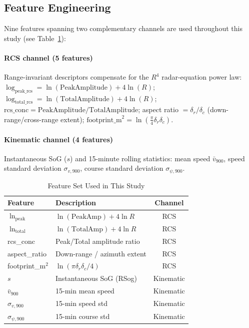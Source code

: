 \documentclass[10pt,journal,compsoc]{IEEEtran}
\begin{document}
\subsection{Feature Engineering}

Nine features spanning two complementary channels are used throughout this
study (see Table~\ref{tab:features}):

\paragraph{RCS channel (5 features)} Range-invariant descriptors compensate for
the $R^4$ radar-equation power law: $\log_{\text{peak\_rcs}} =
\ln(\text{PeakAmplitude}) + 4\ln(R)$; $\log_{\text{total\_rcs}} =
\ln(\text{TotalAmplitude}) + 4\ln(R)$; $\text{rcs\_conc} =
\text{PeakAmplitude}/\text{TotalAmplitude}$; aspect ratio
$= \delta_r / \delta_c$ (down-range/cross-range extent);
$\text{footprint\_m}^2 = \ln\!\left(\tfrac{\pi}{4}\delta_r\delta_c\right)$.

\paragraph{Kinematic channel (4 features)} Instantaneous SoG ($s$) and
15-minute rolling statistics: mean speed $\bar{v}_{900}$, speed standard
deviation $\sigma_{v,900}$, course standard deviation $\sigma_{\psi,900}$.

\begin{table}[!t]
\centering\small
\caption{Feature Set Used in This Study}
\label{tab:features}
\begin{tabular}{llc}
\toprule
Feature & Description & Channel \\
\midrule
$\ln_{\text{peak}}$ & $\ln(\text{PeakAmp})+4\ln R$ & RCS \\
$\ln_{\text{total}}$ & $\ln(\text{TotalAmp})+4\ln R$ & RCS \\
rcs\_conc & Peak/Total amplitude ratio & RCS \\
aspect\_ratio & Down-range / azimuth extent & RCS \\
footprint\_m$^2$ & $\ln(\pi \delta_r \delta_c/4)$ & RCS \\
$s$ & Instantaneous SoG (RSog) & Kinematic \\
$\bar{v}_{900}$ & 15-min mean speed & Kinematic \\
$\sigma_{v,900}$ & 15-min speed std & Kinematic \\
$\sigma_{\psi,900}$ & 15-min course std & Kinematic \\
\bottomrule
\end{tabular}
\end{table}
\end{document}
